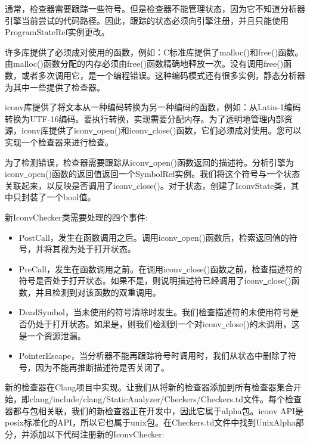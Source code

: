 通常，检查器需要跟踪一些符号。但是检查器不能管理状态，因为它不知道分析器引擎当前尝试的代码路径。因此，跟踪的状态必须向引擎注册，并且只能使用ProgramStateRef实例更改。\par

许多库提供了必须成对使用的函数，例如：C标准库提供了malloc()和free()函数。由malloc()函数分配的内存必须由free()函数精确地释放一次。没有调用free()函数，或者多次调用它，是一个编程错误。这种编码模式还有很多实例，静态分析器为其中一些提供了检查器。\par

iconv库提供了将文本从一种编码转换为另一种编码的函数，例如：从Latin-1编码转换为UTF-16编码。要执行转换，实现需要分配内存。为了透明地管理内部资源，iconv库提供了iconv\underline{~}open()和iconv\underline{~}close()函数，它们必须成对使用。您可以实现一个检查器来进行检查。\par

为了检测错误，检查器需要跟踪从iconv\underline{~}open()函数返回的描述符。分析引擎为iconv\underline{~}open()函数的返回值返回一个SymbolRef实例。我们将这个符号与一个状态关联起来，以反映是否调用了iconv\underline{~}close()。对于状态，创建了IconvState类，其中只封装了一个bool值。\par

新IconvChecker类需要处理的四个事件:\par

\begin{itemize}
\item PostCall，发生在函数调用之后。调用iconv\underline{~}open()函数后，检索返回值的符号，并将其视为处于打开状态。

\item PreCall，发生在函数调用之前。在调用iconv\underline{~}close()函数之前，检查描述符的符号是否处于打开状态。如果不是，则说明描述符已经调用了iconv\underline{~}close()函数，并且检测到对该函数的双重调用。

\item DeadSymbol，当未使用的符号清除时发生。我们检查描述符的未使用符号是否仍处于打开状态。如果是，则我们检测到一个对iconv\underline{~}close()的未调用，这是一个资源泄漏。

\item PointerEscape，当分析器不能再跟踪符号时调用时，我们从状态中删除了符号，因为不能再推断描述符是否关闭了。

\end{itemize}

新的检查器在Clang项目中实现。让我们从将新的检查器添加到所有检查器集合开始，即clang/include/clang/StaticAnalyzer/Checkers/Checkers.td文件。每个检查器都与包相关联，我们的新检查器正在开发中，因此它属于alpha包。iconv API是posix标准化的API，所以它也属于unix包。在Checkers.td文件中找到UnixAlpha部分，并添加以下代码注册新的IconvChecker:\par

